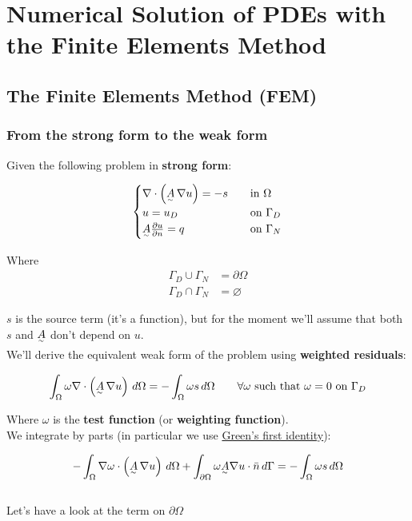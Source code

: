 \section{Numerical Solution of PDEs with the Finite Elements Method}

\subsection{The Finite Elements Method (FEM)}

\subsubsection{From the strong form to the weak form}

Given the following problem in \textbf{strong form}: 

\[
  \begin{cases}
    \nabla\cdot\left(\underset{^\sim}{A}\,\nabla u\right) = -s \quad &\text{in }\Omega\\
    u = u_D \quad &\text{on } \Gamma_D\\
    \underset{^\sim}{A}\frac{\partial u}{\partial n} = q \quad &\text{on } \Gamma_N
  \end{cases}
\]

Where 
\begin{align*}
      \Gamma_D\cup\Gamma_N &= \partial\Omega\\
      \Gamma_D\cap\Gamma_N &= \varnothing
\end{align*}

$s$ is the source term (it's a function), but for the moment we'll assume that both $s$ and $\underset{^\sim}{A}$ don't depend on $u$. \\

We'll derive the equivalent weak form of the problem using \textbf{weighted residuals}:

\[
  \int_\Omega\omega\nabla\cdot\left(\underset{^\sim}{A}\,\nabla u\right)\,d\Omega = -\int_\Omega \omega s \, d\Omega \qquad\forall \omega \text{ such that } \omega = 0 \text{ on } \Gamma_D
\]

Where $\omega$ is the \textbf{test function} (or \textbf{weighting function}). \\

We integrate by parts (in particular we use \href{https://en.wikipedia.org/wiki/Green's_identities}{Green's first identity}):

\[
  -\int_{\Omega} \nabla\omega\cdot\left(\underset{^\sim}{A}\,\nabla u\right)\,d\Omega + \int_{\partial\Omega} \omega\underset{^\sim}{A}\nabla u\cdot\Bar{n} \,d\Gamma = -\int_\Omega \omega s \, d\Omega
\]\-\\
Let's have a look at the term on $\partial\Omega$

